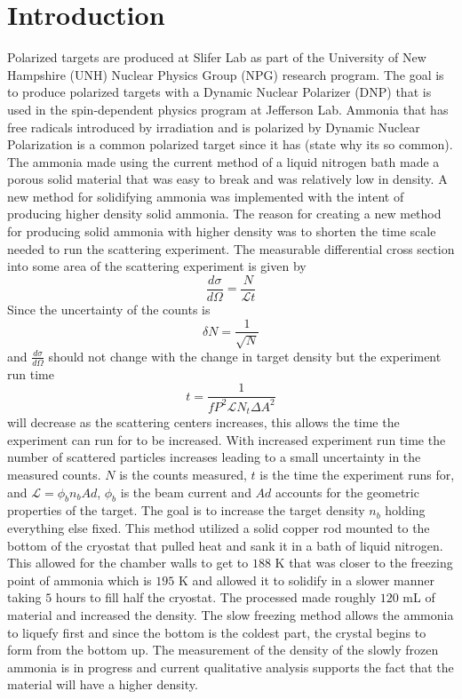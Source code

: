 \documentclass[12pt,notitlepage]{amsart}
\begin{document}
\newpage
  \tableofcontents
\newpage
 
  \section{Introduction}
Polarized targets are produced at Slifer Lab as part of the University of New Hampshire (UNH) Nuclear Physics Group (NPG) research program. The goal is to produce polarized targets with a Dynamic Nuclear Polarizer (DNP) that is used in the spin-dependent physics program at Jefferson Lab. Ammonia that has free radicals introduced by irradiation and is polarized by Dynamic Nuclear Polarization is a common polarized target since it has (state why its so common). The ammonia made using the current method of a liquid nitrogen bath made a porous solid material that was easy to break and was relatively low in density.  A new method for solidifying ammonia was implemented with the intent of producing higher density solid ammonia. The reason for creating a new method for producing solid ammonia with higher density was to shorten the time scale needed to run the scattering experiment. The measurable differential cross section into some area of the scattering experiment is given by \cite{nuke}
\begin{equation}
\frac{d\sigma}{d\Omega} = \frac{N}{\mathcal{L}t}
\end{equation}
Since the uncertainty of the counts is
\begin{equation}
\delta N = \frac{1}{\sqrt{N}}
\end{equation}
and  $\frac{d\sigma}{d\Omega} $ should not change with the change in target density but the experiment run time \cite{maxwell}
\begin{equation}
t = \frac{1}{fP^{2} \mathcal{L} N_{t} \Delta A^{2}}
\end{equation}
will decrease as the scattering centers increases, this allows the time the experiment can run for to be increased. With increased experiment run time the number of scattered particles increases leading to a small uncertainty in the measured counts. 
$N$ is the counts measured, $t$ is the time the experiment runs for,  and $\mathcal{L} = \phi_{b} n_{b}Ad$, $\phi_{b}$ is the beam current and $Ad$ accounts for the geometric properties of the target. The goal is to increase the target density $n_{b}$ holding everything else fixed. This method utilized a solid copper rod mounted to the bottom of the cryostat that pulled heat and sank it in a bath of liquid nitrogen. This allowed for the chamber walls to get to $188$ K that was closer to the freezing point of ammonia which is $195$ K and allowed it to solidify in a slower manner taking $5$ hours to fill half the cryostat. The processed made roughly $120$ mL of material and increased the density. The slow freezing method allows the ammonia to liquefy first and since the bottom is the coldest part, the crystal begins to form from the bottom up.  The measurement of the density of the slowly frozen ammonia is in progress and current qualitative analysis supports the fact that the material will have a higher density. 
  
\end{document}
